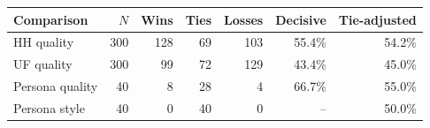 \small
\begin{tabular}{lrrrrrr}
\toprule
Comparison & $N$ & Wins & Ties & Losses & Decisive & Tie-adjusted \\
\midrule
HH quality & 300 & 128 & 69 & 103 & 55.4\% & 54.2\% \\
UF quality & 300 & 99 & 72 & 129 & 43.4\% & 45.0\% \\
Persona quality & 40 & 8 & 28 & 4 & 66.7\% & 55.0\% \\
Persona style & 40 & 0 & 40 & 0 & -- & 50.0\% \\
\bottomrule
\end{tabular}

